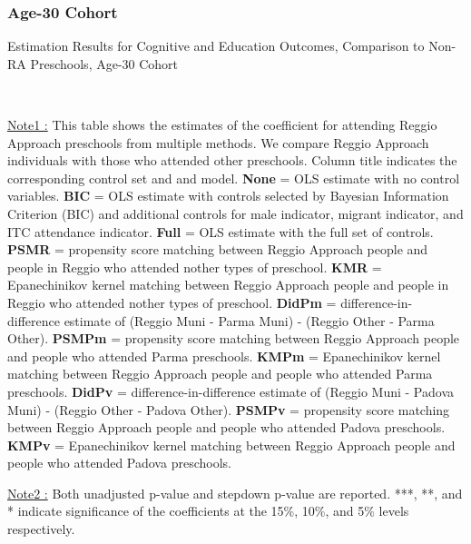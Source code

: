 \subsubsection{Age-30 Cohort}
\begin{table}[H] \caption{Estimation Results for Cognitive and Education Outcomes, Comparison to Non-RA Preschools, Age-30 Cohort} \label{ols-CN-adult30-reg-other}
\scalebox{0.6}{}
\vspace{1ex} \\
\footnotesize\raggedright{\underline{Note1 :} This table shows the estimates of the coefficient for attending Reggio Approach preschools from multiple methods. We compare Reggio Approach individuals with those who attended other preschools. Column title indicates the corresponding control set and and model. \textbf{None} = OLS estimate with no control variables. \textbf{BIC} = OLS estimate with controls selected by Bayesian Information Criterion (BIC) and additional controls for male indicator, migrant indicator, and ITC attendance indicator. \textbf{Full} = OLS estimate with the full set of controls. \textbf{PSMR} =  propensity score matching between Reggio Approach people and people in Reggio who attended nother types of preschool. \textbf{KMR} = Epanechinikov kernel matching between Reggio Approach people and people in Reggio who attended nother types of preschool. \textbf{DidPm} = difference-in-difference estimate of (Reggio Muni - Parma Muni) - (Reggio Other - Parma Other). \textbf{PSMPm} = propensity score matching between Reggio Approach people and people who attended Parma preschools. \textbf{KMPm} = Epanechinikov kernel matching between Reggio Approach people and people who attended Parma preschools. \textbf{DidPv} = difference-in-difference estimate of (Reggio Muni - Padova Muni) - (Reggio Other - Padova Other). \textbf{PSMPv} = propensity score matching between Reggio Approach people and people who attended Padova preschools. \textbf{KMPv} = Epanechinikov kernel matching between Reggio Approach people and people who attended Padova preschools.} 

\footnotesize\raggedright{\underline{Note2 :} Both unadjusted p-value and stepdown p-value are reported. ***, **, and * indicate significance of the coefficients at the 15\%, 10\%, and 5\% levels respectively.}
\end{table}


